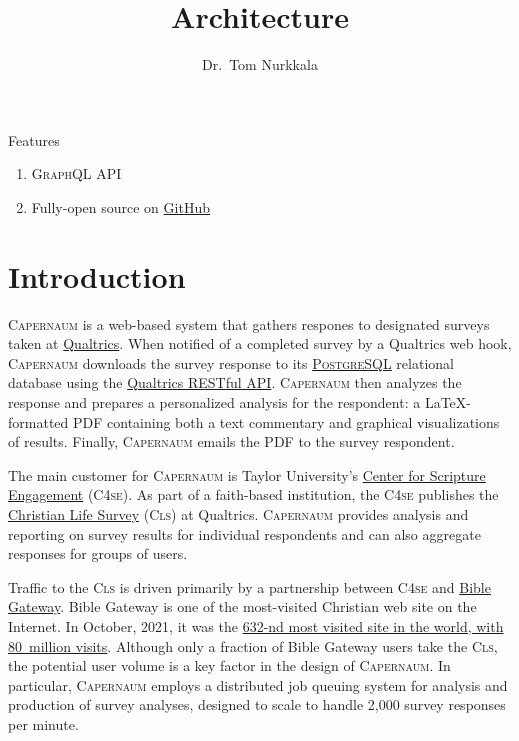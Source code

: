 \documentclass{article}
\title{\caper{} Architecture}
\author{Dr.\ Tom Nurkkala}
\newcommand{\caper}{\textsc{Capernaum}}
\newcommand{\cfse}{\textsc{C4se}}
\newcommand{\cls}{\textsc{Cls}}
\newcommand{\gql}{\textsc{GraphQL}}
\newcommand{\pg}{\textsc{PostgreSQL}}
\begin{document}
\maketitle

\begin{cbox}{Features}
  \begin{enumerate}
  \item \gql{} API
  \item Fully-open source on \href{https://github.com/quantum-bits/capernaum.git}{GitHub}
  \end{enumerate}
\end{cbox}

\section{Introduction}
\label{sec:introduction}

\caper{} is a web-based system
that gathers respones to designated surveys taken at \href{https://www.qualtrics.com/}{Qualtrics}.
When notified of a completed survey by a Qualtrics web hook,
\caper{}
downloads the survey response
to its \href{https://www.postgresql.org/}{\pg{}} relational database
using the
\href{https://api.qualtrics.com/}{Qualtrics RESTful API}.
\caper{} then
analyzes the response and
prepares a personalized analysis for the respondent:
a \LaTeX-formatted PDF containing both a text commentary
and graphical visualizations of results.
Finally, \caper{}
emails the PDF to the survey respondent.

The main customer for \caper{}
is Taylor University's
\href{https://www.taylor.edu/center-for-scripture-engagement/}{Center for Scripture Engagement}
(\cfse).
As part of a faith-based institution,
the \cfse{} publishes the
\href{https://www.taylor.edu/center-for-scripture-engagement/survey/}{Christian Life Survey}
(\cls)
at Qualtrics.
\caper{} provides analysis and reporting on survey results
for individual respondents and
can also aggregate responses for groups of users.

Traffic to the \cls{} is driven primarily by a partnership between \cfse{} and
\href{https://www.biblegateway.com/}{Bible Gateway}.
Bible Gateway is one of the most-visited Christian web site on the Internet.
In October, 2021, it was the
\href{https://www.similarweb.com/website/biblegateway.com/}{632-nd most visited site in the world,
  with 80~million visits}.
Although only a fraction of Bible Gateway users take the \cls,
the potential user volume is a key factor in the design of \caper.
In particular, \caper{} employs a distributed job queuing system
for analysis and production of survey analyses,
designed to scale to handle 2,000 survey responses per minute.
\end{document}
